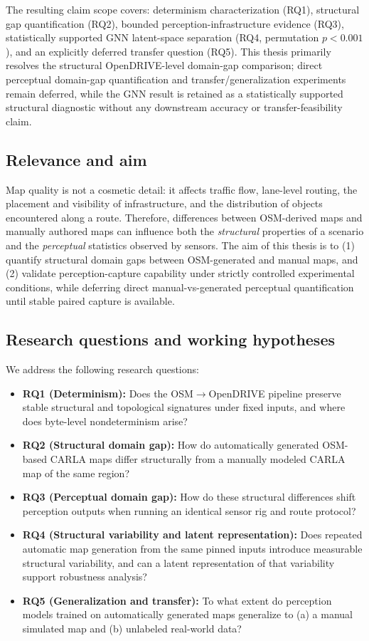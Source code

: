 The resulting claim scope covers: determinism characterization (RQ1), structural gap quantification (RQ2), bounded perception-infrastructure evidence (RQ3), statistically supported GNN latent-space separation (RQ4, permutation $p<0.001$), and an explicitly deferred transfer question (RQ5). This thesis primarily resolves the structural OpenDRIVE-level domain-gap comparison; direct perceptual domain-gap quantification and transfer/generalization experiments remain deferred, while the GNN result is retained as a statistically supported structural diagnostic without any downstream accuracy or transfer-feasibility claim.

\subsection{Relevance and aim}
Map quality is not a cosmetic detail: it affects traffic flow, lane-level routing, the placement and visibility of infrastructure, and the distribution of objects encountered along a route.
Therefore, differences between OSM-derived maps and manually authored maps can influence both the \emph{structural} properties of a scenario and the \emph{perceptual} statistics observed by sensors.
The aim of this thesis is to (1) quantify structural domain gaps between OSM-generated and manual maps, and (2) validate perception-capture capability under strictly controlled experimental conditions, while deferring direct manual-vs-generated perceptual quantification until stable paired capture is available.

\subsection{Research questions and working hypotheses}
We address the following research questions:

\begin{itemize}
  \item \textbf{RQ1 (Determinism):} Does the OSM$\rightarrow$OpenDRIVE pipeline preserve stable structural and topological signatures under fixed inputs, and where does byte-level nondeterminism arise?
  \item \textbf{RQ2 (Structural domain gap):} How do automatically generated OSM-based CARLA maps differ structurally from a manually modeled CARLA map of the same region?
  \item \textbf{RQ3 (Perceptual domain gap):} How do these structural differences shift perception outputs when running an identical sensor rig and route protocol?
  \item \textbf{RQ4 (Structural variability and latent representation):} Does repeated automatic map generation from the same pinned inputs introduce measurable structural variability, and can a latent representation of that variability support robustness analysis?
  \item \textbf{RQ5 (Generalization and transfer):} To what extent do perception models trained on automatically generated maps generalize to (a) a manual simulated map and (b) unlabeled real-world data?
\end{itemize}


